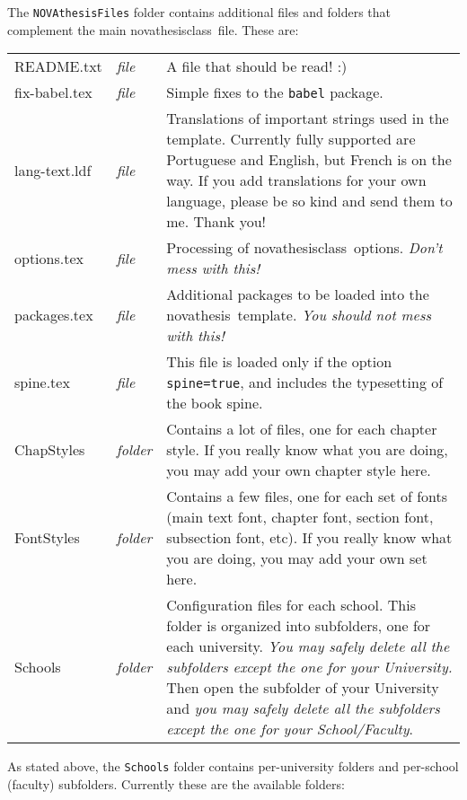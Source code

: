The \texttt{NOVAthesisFiles} folder contains additional files and folders that complement the main \gls{novathesisclass}\ file.  These are:

\noindent
\begin{tabularx}{\linewidth}{>{\ttfamily}l>{\itshape}l>{\upshape}X}
README.txt      & file    &
A file that should be read!  :) 
\\
fix-babel.tex   & file    &
Simple fixes to the \texttt{babel} package.
\\
lang-text.ldf   & file    &
Translations of important strings used in the template.  Currently fully supported are Portuguese and English, but French is on the way.  If you add translations for your own language, please be so kind and send them to me. Thank you!
\\
options.tex     & file    &
Processing of \gls{novathesisclass}\ options.  \emph{Don't mess with this!}
\\
packages.tex    & file    &
Additional packages to be loaded into the \gls{novathesis}\ template. \emph{You should not mess with this!}
\\
spine.tex       & file    &
This file is loaded only if the option \texttt{spine=true}, and includes the typesetting of the book spine.
\\
ChapStyles      & folder  &
Contains a lot of files, one for each chapter style.  If you really know what you are doing, you may add your own chapter style here.
\\
FontStyles      & folder  &
Contains a few files, one for each set of fonts (main text font, chapter font, section font, subsection font, etc).  If you really know what you are doing, you may add your own set here.
\\
Schools         & folder  &
Configuration files for each school.  This folder is organized into subfolders, one for each university.  \emph{You may safely delete all the subfolders except the one for your University.}  Then open the subfolder of your University and \emph{you may safely delete all the subfolders except the one for your School/Faculty}.
\\
\end{tabularx}

As stated above, the \texttt{Schools} folder contains per-university folders and per-school (faculty) subfolders.  Currently these are the available folders:

